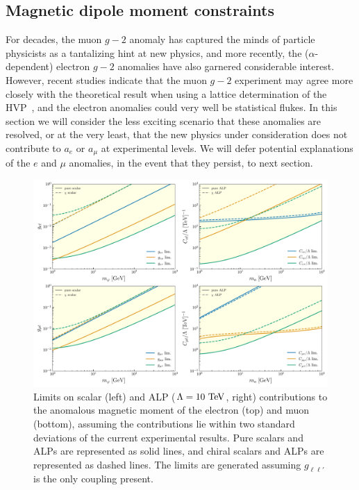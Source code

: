 {\subsection{Magnetic dipole moment constraints}\label{sec:mdm_constraints}
For decades, the muon $g-2$ anomaly has captured the minds of particle physicists as a tantalizing hint at new physics, and more recently, the ($\alpha$-dependent) electron $g-2$ anomalies have also garnered considerable interest. However, recent studies indicate that the muon $g-2$ experiment may agree more closely with the theoretical result when using a lattice determination of the HVP~\cite{Lehner:2020crt,Borsanyi:2020mff,Boccaletti:2024guq,Bazavov:2024eou}, and the electron anomalies could very well be statistical flukes. In this section we will consider the less exciting scenario that these anomalies are resolved, or at the very least, that the new physics under consideration does not contribute to $a_e$ or $a_\mu$ at experimental levels. We will defer potential explanations of the $e$ and $\mu$ anomalies, in the event that they persist, to next section.



\begin{figure}[t!]
    \centering
    \includegraphics[width=\linewidth]{figures/chapter3/LFV_MDM_limits.pdf}
    \caption[Constraints on LFV scalar and ALP couplings from the lepton magnetic moments.]{Limits on scalar (left) and ALP ($\Lambda = 10~{\rm TeV}$, right) contributions to the anomalous magnetic moment of the electron (top) and muon (bottom), assuming the contributions lie within two standard deviations of the current experimental results. Pure scalars and ALPs are represented as solid lines, and chiral scalars and ALPs are represented as dashed lines. The limits are generated assuming $g_{\ell\ell'}$ is the only coupling present.}
    \label{fig:mdm_limits}
\end{figure}

}
